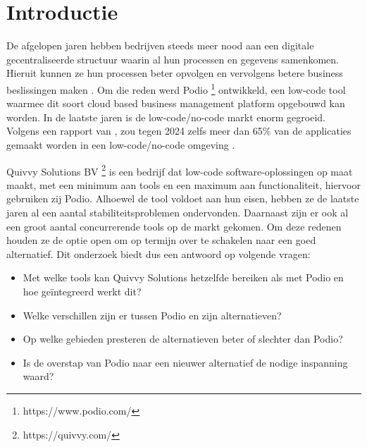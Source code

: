 
\section{Introductie}%
\label{sec:introductie}


De afgelopen jaren hebben bedrijven steeds meer nood aan een digitale gecentraliseerde structuur waarin al hun processen en gegevens samenkomen. Hieruit kunnen ze hun processen beter opvolgen en vervolgens betere business beslissingen maken \autocite{CFI2022}. Om die reden werd Podio \footnote{https://www.podio.com/} ontwikkeld, een low-code tool waarmee dit soort cloud based business management platform opgebouwd kan worden. In de laatste jaren is de low-code/no-code markt enorm gegroeid. Volgens een rapport van \textcite{Costello2021}, zou tegen 2024 zelfs meer dan 65\% van de applicaties gemaakt worden in een low-code/no-code omgeving \autocite{Brown2022}.


Quivvy Solutions BV \footnote{https://quivvy.com/} is een bedrijf dat low-code software-oplossingen op maat maakt, met een minimum aan tools en een maximum aan functionaliteit, hiervoor gebruiken zij Podio. Alhoewel de tool voldoet aan hun eisen, hebben ze de laatste jaren al een aantal stabiliteitsproblemen ondervonden. Daarnaast zijn er ook al een groot aantal concurrerende tools op de markt gekomen. Om deze redenen houden ze de optie open om op termijn over te schakelen naar een goed alternatief. Dit onderzoek biedt dus een antwoord op volgende vragen:

\begin{itemize}
    \item Met welke tools kan Quivvy Solutions hetzelfde bereiken als met Podio en hoe geïntegreerd werkt dit? 
    \item Welke verschillen zijn er tussen Podio en zijn alternatieven?
    \item Op welke gebieden presteren de alternatieven beter of slechter dan Podio?
    \item Is de overstap van Podio naar een nieuwer alternatief de nodige inspanning waard?
\end{itemize}


